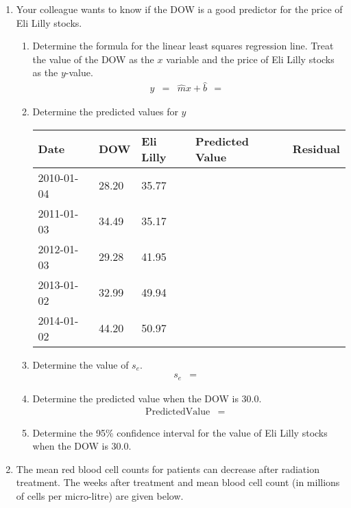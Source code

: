 \documentclass[12pt]{article}
\begin{document}
\begin{enumerate}
\item Your colleague wants to know if the DOW is a good predictor for
  the price of Eli Lilly stocks.

  \begin{enumerate}
  \item Determine the formula for the linear least squares regression
    line. Treat the value of the DOW as the $x$ variable and the price
    of Eli Lilly stocks as the $y$-value.
    \begin{eqnarray*}
      y & = & \hat{m} x + \hat{b} ~~ = ~~ 
    \end{eqnarray*}
  \item Determine the predicted values for $y$  \\
    \begin{tabular}{l|l|l|l|l}
      Date & DOW & Eli Lilly & Predicted Value & Residual\\ \hline
      2010-01-04 & 28.20 & 35.77 & & \\
      2011-01-03 & 34.49 & 35.17 & &  \\
      2012-01-03 & 29.28 & 41.95 & &  \\
      2013-01-02 & 32.99 & 49.94 & &  \\
      2014-01-02 & 44.20 & 50.97 & & 
    \end{tabular}
  \item Determine the value of $s_e$.
    \begin{eqnarray*}
      s_e & = & 
    \end{eqnarray*}
  \item Determine the predicted value when the DOW is 30.0.
    \begin{eqnarray*}
      \mathrm{Predicted Value} & = & 
    \end{eqnarray*}
  \item Determine the 95\% confidence interval for the value of Eli
    Lilly stocks when the DOW is 30.0.
    \vfill
  \end{enumerate}

\clearpage

\item The mean red blood cell counts for patients can decrease after
  radiation treatment. The weeks after treatment and mean blood cell
  count (in millions of cells per micro-litre) are given below.


\end{enumerate}
\end{document}
